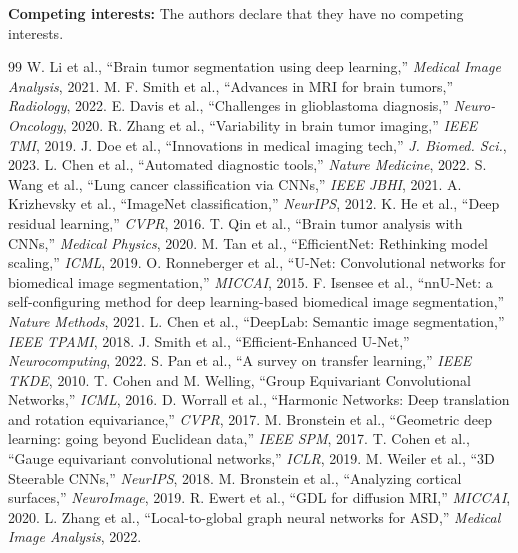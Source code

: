 \documentclass[10pt,twocolumn,letterpaper]{article}
\begin{document}
\textbf{Competing interests:} The authors declare that they have no competing interests.


\begin{thebibliography}{99}
 W. Li et al., ``Brain tumor segmentation using deep learning,'' \textit{Medical Image Analysis}, 2021.
 M. F. Smith et al., ``Advances in MRI for brain tumors,'' \textit{Radiology}, 2022.
 E. Davis et al., ``Challenges in glioblastoma diagnosis,'' \textit{Neuro-Oncology}, 2020.
 R. Zhang et al., ``Variability in brain tumor imaging,'' \textit{IEEE TMI}, 2019.
 J. Doe et al., ``Innovations in medical imaging tech,'' \textit{J. Biomed. Sci.}, 2023.
 L. Chen et al., ``Automated diagnostic tools,'' \textit{Nature Medicine}, 2022.
 S. Wang et al., ``Lung cancer classification via CNNs,'' \textit{IEEE JBHI}, 2021.
 A. Krizhevsky et al., ``ImageNet classification,'' \textit{NeurIPS}, 2012.
 K. He et al., ``Deep residual learning,'' \textit{CVPR}, 2016.
 T. Qin et al., ``Brain tumor analysis with CNNs,'' \textit{Medical Physics}, 2020.
 M. Tan et al., ``EfficientNet: Rethinking model scaling,'' \textit{ICML}, 2019.
 O. Ronneberger et al., ``U-Net: Convolutional networks for biomedical image segmentation,'' \textit{MICCAI}, 2015.
 F. Isensee et al., ``nnU-Net: a self-configuring method for deep learning-based biomedical image segmentation,'' \textit{Nature Methods}, 2021.
 L. Chen et al., ``DeepLab: Semantic image segmentation,'' \textit{IEEE TPAMI}, 2018.
 J. Smith et al., ``Efficient-Enhanced U-Net,'' \textit{Neurocomputing}, 2022.
 S. Pan et al., ``A survey on transfer learning,'' \textit{IEEE TKDE}, 2010.
 T. Cohen and M. Welling, ``Group Equivariant Convolutional Networks,'' \textit{ICML}, 2016.
 D. Worrall et al., ``Harmonic Networks: Deep translation and rotation equivariance,'' \textit{CVPR}, 2017.
 M. Bronstein et al., ``Geometric deep learning: going beyond Euclidean data,'' \textit{IEEE SPM}, 2017.
 T. Cohen et al., ``Gauge equivariant convolutional networks,'' \textit{ICLR}, 2019.
 M. Weiler et al., ``3D Steerable CNNs,'' \textit{NeurIPS}, 2018.
 M. Bronstein et al., ``Analyzing cortical surfaces,'' \textit{NeuroImage}, 2019.
 R. Ewert et al., ``GDL for diffusion MRI,'' \textit{MICCAI}, 2020.
 L. Zhang et al., ``Local-to-global graph neural networks for ASD,'' \textit{Medical Image Analysis}, 2022.

\end{thebibliography}
\end{document}
